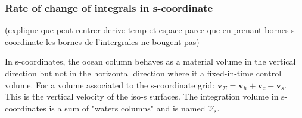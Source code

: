 \subsubsection{Rate of change of integrals in s-coordinate}

(explique que peut rentrer derive temp et espace parce que en prenant bornes s-coordinate les bornes de l'intergrales ne bougent pas)


In s-coordinates, the ocean column behaves as a material volume in the vertical direction but not in the horizontal direction where it a fixed-in-time control volume. For a volume associated to the s-coordinate grid: $  \mathbf{v}_{\Sigma}=\mathbf{v}_h+\mathbf{v}_z-\mathbf{v}_s$. This is the vertical velocity of the iso-s surfaces. The integration volume in s-coordinates is a sum of "waters columns" and is named $\mathcal{V}_s$. 

